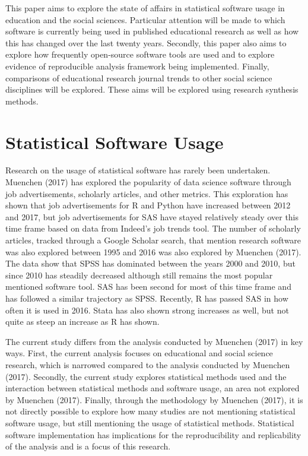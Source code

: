 \documentclass[
  english,
  ,man]{apa6}
\begin{document}
This paper aims to explore the state of affairs in statistical software usage in education and the social sciences. Particular attention will be made to which software is currently being used in published educational research as well as how this has changed over the last twenty years. Secondly, this paper also aims to explore how frequently open-source software tools are used and to explore evidence of reproducible analysis framework being implemented. Finally, comparisons of educational research journal trends to other social science disciplines will be explored. These aims will be explored using research synthesis methods.

\hypertarget{statistical-software-usage}{%
\section{Statistical Software Usage}\label{statistical-software-usage}}

Research on the usage of statistical software has rarely been undertaken. Muenchen (2017) has explored the popularity of data science software through job advertisements, scholarly articles, and other metrics. This exploration has shown that job advertisements for R and Python have increased between 2012 and 2017, but job advertisements for SAS have stayed relatively steady over this time frame based on data from Indeed's job trends tool. The number of scholarly articles, tracked through a Google Scholar search, that mention research software was also explored between 1995 and 2016 was also explored by Muenchen (2017). The data show that SPSS has dominated between the years 2000 and 2010, but since 2010 has steadily decreased although still remains the most popular mentioned software tool. SAS has been second for most of this time frame and has followed a similar trajectory as SPSS. Recently, R has passed SAS in how often it is used in 2016. Stata has also shown strong increases as well, but not quite as steep an increase as R has shown.

The current study differs from the analysis conducted by Muenchen (2017) in key ways. First, the current analysis focuses on educational and social science research, which is narrowed compared to the analysis conducted by Muenchen (2017). Secondly, the current study explores statistical methods used and the interaction between statistical methods and software usage, an area not explored by Muenchen (2017). Finally, through the methodology by Muenchen (2017), it is not directly possible to explore how many studies are not mentioning statistical software usage, but still mentioning the usage of statistical methods. Statistical software implementation has implications for the reproducibility and replicability of the analysis and is a focus of this research.
\end{document}
